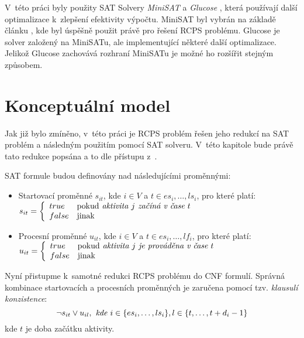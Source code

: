 \documentclass[a4paper, 12pt]{article}
\begin{document}
V~této práci byly použity SAT Solvery \emph{MiniSAT} \cite{www:minisat} a \emph{Glucose} \cite{www:glucose}, která
používají další optimalizace k~zlepšení efektivity výpočtu.
MiniSAT byl vybrán na základě článku \cite{horbach:10}, kde byl úspěšně použit právě pro řešení RCPS problému.
Glucose je solver založený na MiniSATu, ale implementující některé další optimalizace.
Jelikož Glucose zachovává rozhraní MiniSATu je možné ho rozšířit stejným způsobem.

\section{Konceptuální model}
\label{sec:concept}
Jak již bylo zmíněno, v~této práci je RCPS problém řešen jeho redukcí na SAT problém a následným použitím pomocí SAT solveru.
V~této kapitole bude právě tato redukce popsána a to dle přístupu z~\cite{horbach:10}.

SAT formule budou definovány nad následujícími proměnnými:
\begin{itemize}
    \item Startovací proměnné $s_{it}$, kde $i\in V$ a $t\in{es_i,\ldots,ls_i}$, pro které platí: \newline 
    $s_{it}=
        \left\{
        \begin{array}{ll}
             true & \mbox{pokud} \emph{ aktivita }j \emph{ začíná v~čase }t \\
             false & \mbox{jinak}\\
        \end{array}
        \right.
        $
    \item Procesní proměnné $u_{it}$, kde $i \in V$ a $t \in {es_i,\ldots, lf_i}$, pro které platí: \newline
    $u_{it}=
        \left\{
        \begin{array}{ll}
             true & \mbox{pokud} \emph{ aktivita }j \emph{ je prováděna  v~čase }t \\
             false & \mbox{jinak}\\
        \end{array}
        \right.
        $
\end{itemize}

Nyní přistupme k~samotné redukci RCPS problému do CNF formulí.
Správná kombinace startovacích a procesních proměnných je zaručena pomocí tzv. \emph{klausulí konzistence}:
\begin{equation}
\label{eq:1}
   \neg s_{it} \vee u_{il},\emph{ kde } i\in\{es_i,\ldots,ls_i\}, l\in\{t,\ldots,t+d_i-1\}  
\end{equation}
kde $t$ je doba začátku aktivity.
\end{document}
